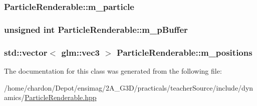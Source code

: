 \hypertarget{classParticleRenderable_a40dd90b39f07278bfc9e5b9017c08592}{
\subsubsection[{m\+\_\+particle}]{ Particle\+Renderable\+::m\+\_\+particle\hspace{0.3cm}{\ttfamily [private]}}}\label{classParticleRenderable_a40dd90b39f07278bfc9e5b9017c08592}
\hypertarget{classParticleRenderable_a42d3e2dc47524177be00fbc7ee1a244b}{
\subsubsection[{m\+\_\+p\+Buffer}]{\setlength{\rightskip}{0pt plus 5cm}unsigned int Particle\+Renderable\+::m\+\_\+p\+Buffer\hspace{0.3cm}{\ttfamily [private]}}}\label{classParticleRenderable_a42d3e2dc47524177be00fbc7ee1a244b}
\hypertarget{classParticleRenderable_ae471301b0257ebc014ed7dabf16ebd16}{
\subsubsection[{m\+\_\+positions}]{\setlength{\rightskip}{0pt plus 5cm}std\+::vector$<$ glm\+::vec3 $>$ Particle\+Renderable\+::m\+\_\+positions\hspace{0.3cm}{\ttfamily [private]}}}\label{classParticleRenderable_ae471301b0257ebc014ed7dabf16ebd16}


The documentation for this class was generated from the following file\+:\begin{DoxyCompactItemize}
\item 
/home/chardon/\+Depot/ensimag/2\+A\+\_\+\+G3\+D/practicals/teacher\+Source/include/dynamics/\hyperlink{ParticleRenderable_8hpp}{Particle\+Renderable.\+hpp}\end{DoxyCompactItemize}
